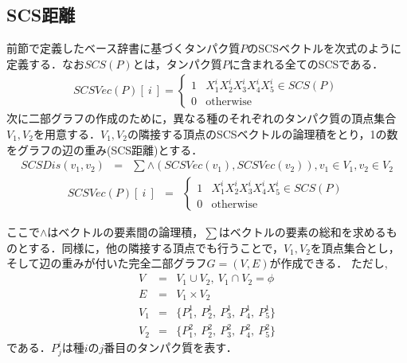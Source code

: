 \subsection{SCS距離}
前節で定義したベース辞書に基づくタンパク質$P$のSCSベクトルを次式のように定義する．なお$SCS(P)$とは，タンパク質$P$に含まれる全てのSCSである．
\begin{eqnarray}
\mathit{SCSVec(P)[\ i\ ]} =  
\begin{cases}
1&X_1^i X_2^iX_3^iX_4^iX_5^i \in \mathit{SCS(P)}\\
0&\mathrm{otherwise}
\end{cases}
\end{eqnarray}
次に二部グラフの作成のために，異なる種のそれぞれのタンパク質の頂点集合$V_1, V_2$を用意する．$V_1, V_2$の隣接する頂点のSCSベクトルの論理積をとり，1の数をグラフの辺の重み(SCS距離)とする．
\begin{align}
\mathit{SCSDis}(v_1, v_2) &=& \sum\land(\mathit{SCSVec}(v_1), \mathit{SCSVec}(v_2)), v_1\in V_1, v_2 \in V_2
\end{align}
%
\begin{eqnarray}
\mathit{SCSVec}(P)[\ i\ ] &=&  
\begin{cases}
1&X_1^i X_2^iX_3^iX_4^iX_5^i \in \mathit{SCS}(P)\\
0&\mathrm{otherwise}
\end{cases}
\end{eqnarray}

ここで$\land$はベクトルの要素間の論理積，$\sum$はベクトルの要素の総和を求めるものとする．同様に，他の隣接する頂点でも行うことで，$V_1, V_2$を頂点集合とし，そして辺の重みが付いた完全二部グラフ$G = (V, E)$が作成できる．
ただし,
\begin{eqnarray}
V &=& V_1 \cup V_2,\ V_1 \cap V_2 = \phi\\
E &=&  V_1 \times V_2\\
V_1 &=& \{P_1^1,\ P_2^1,\ P_3^1,\ P_4^1,\ P_5^1\}\\
V_2 &=& \{P_1^2,\ P_2^2,\ P_3^2,\ P_4^2,\ P_5^2\}
\end{eqnarray}
である．$P_j^i$は種$i$の$j$番目のタンパク質を表す．